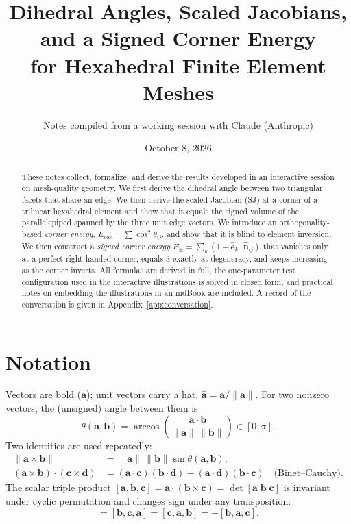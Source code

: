 \documentclass[11pt]{article}
\title{Dihedral Angles, Scaled Jacobians, and a Signed Corner Energy\\
\large for Hexahedral Finite Element Meshes}
\author{Notes compiled from a working session with Claude (Anthropic)}
\date{October 8, 2026}
\theoremstyle{definition}
\theoremstyle{remark}
\newcommand{\vb}[1]{\bm{#1}}
\newcommand{\uv}[1]{\hat{\bm{#1}}}
\newcommand{\Es}{E_{\pm}}
\newcommand{\Eu}{E_{\cos}}
\begin{document}
\maketitle

\begin{abstract}
These notes collect, formalize, and derive the results developed in an interactive
session on mesh-quality geometry. We first derive the dihedral angle between two
triangular facets that share an edge. We then derive the scaled Jacobian (SJ) at a
corner of a trilinear hexahedral element and show that it equals the signed volume of
the parallelepiped spanned by the three unit edge vectors. We introduce an
orthogonality-based \emph{corner energy}, $\Eu=\sum\cos^2\theta_{ij}$, and show that it
is blind to element inversion. We then construct a \emph{signed corner energy}
$\Es=\sum_k(1-\uv{e}_k\cdot\uv{n}_{ij})$ that vanishes only at a perfect right-handed
corner, equals $3$ exactly at degeneracy, and keeps increasing as the corner inverts.
All formulas are derived in full, the one-parameter test configuration used in the
interactive illustrations is solved in closed form, and practical notes on embedding
the illustrations in an mdBook are included. A record of the conversation is given in
Appendix~\ref{app:conversation}.
\end{abstract}

\tableofcontents
\newpage

\section{Notation}

Vectors are bold ($\vb{a}$); unit vectors carry a hat, $\uv{a}=\vb{a}/\|\vb{a}\|$.
For two nonzero vectors, the (unsigned) angle between them is
\begin{equation}
  \theta(\vb{a},\vb{b}) = \arccos\!\left(\frac{\vb{a}\cdot\vb{b}}{\|\vb{a}\|\,\|\vb{b}\|}\right)\in[0,\pi].
\end{equation}
Two identities are used repeatedly:
\begin{align}
  \|\vb{a}\times\vb{b}\| &= \|\vb{a}\|\,\|\vb{b}\|\sin\theta(\vb{a},\vb{b}), \label{eq:crossnorm}\\
  (\vb{a}\times\vb{b})\cdot(\vb{c}\times\vb{d}) &= (\vb{a}\cdot\vb{c})(\vb{b}\cdot\vb{d})-(\vb{a}\cdot\vb{d})(\vb{b}\cdot\vb{c}) \quad\text{(Binet--Cauchy).} \label{eq:binet}
\end{align}
The scalar triple product $[\vb{a},\vb{b},\vb{c}]=\vb{a}\cdot(\vb{b}\times\vb{c})=\det[\vb{a}\;\vb{b}\;\vb{c}]$
is invariant under cyclic permutation and changes sign under any transposition:
\begin{equation}
  [\vb{a},\vb{b},\vb{c}] = [\vb{b},\vb{c},\vb{a}] = [\vb{c},\vb{a},\vb{b}] = -[\vb{b},\vb{a},\vb{c}].
  \label{eq:cyclic}
\end{equation}
\end{document}
